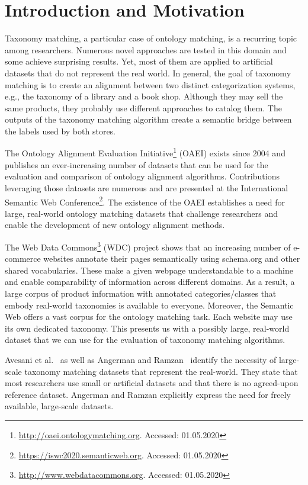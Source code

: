 \chapter{Introduction and Motivation}
\label{ch:introduction}

Taxonomy matching, a particular case of ontology matching, is a recurring topic among researchers.
Numerous novel approaches are tested in this domain and some achieve surprising results.
Yet, most of them are applied to artificial datasets that do not represent the real world.
In general, the goal of taxonomy matching is to create an alignment between two distinct categorization systems, e.g.,
the taxonomy of a library and a book shop.
Although they may sell the same products, they probably use different approaches to catalog them.
The outputs of the taxonomy matching algorithm create a semantic bridge between the labels used by both stores.

The Ontology Alignment Evaluation Initiative\footnote{\url{http://oaei.ontologymatching.org}. Accessed: 01.05.2020} (OAEI)
exists since 2004 and publishes an ever-increasing number of datasets that can be used for the evaluation
and comparison of ontology alignment algorithms.
Contributions leveraging those datasets are numerous and are presented at the International
Semantic Web Conference\footnote{\url{https://iswc2020.semanticweb.org}. Accessed: 01.05.2020}.
The existence of the OAEI establishes a need for large, real-world ontology matching datasets
that challenge researchers and enable the development of new ontology alignment methods.

The Web Data Commons\footnote{\url{http://www.webdatacommons.org}. Accessed: 01.05.2020} (WDC)
project shows that an  increasing number of e-commerce websites annotate their pages semantically
using schema.org and other shared vocabularies.
These make a given webpage understandable to a machine and enable comparability of information across
different domains.
As a result, a large corpus of product information with annotated categories/classes that embody
real-world taxonomies is available to everyone.
Moreover, the Semantic Web offers a vast corpus for the ontology matching  task.
Each  website may use its own  dedicated taxonomy.
This presents us with a possibly large, real-world dataset that we can use for the evaluation of taxonomy
matching algorithms.

Avesani et al.\@~\cite{avesani2005large} as well as Angerman and Ramzan~\cite{angermann2017taxonomy} identify the
necessity of large-scale taxonomy matching datasets that represent the real-world.
They state that most researchers use small or artificial datasets and that there is no agreed-upon reference dataset.
Angerman and Ramzan explicitly express the need for freely available, large-scale datasets.

